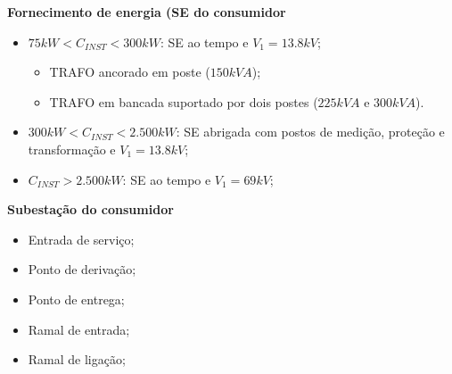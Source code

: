 \textbf{Fornecimento de energia (SE do consumidor}

\begin{itemize}
    \item $75kW < C_{INST} < 300kW$: SE ao tempo e $V_1=13.8kV$;
   	\begin{itemize}
    	\item TRAFO ancorado em poste ($150kVA$);
    	\item TRAFO em bancada suportado por dois postes ($225kVA$ e $300kVA$).
	\end{itemize}
    \item $300kW < C_{INST} < 2.500kW$: SE abrigada com postos de medição, proteção e transformação e $V_1=13.8kV$;
    \item $C_{INST} > 2.500kW$: SE ao tempo e $V_1=69kV$;
\end{itemize}

\textbf{Subestação do consumidor}
\begin{itemize}
    \item Entrada de serviço;
    \item Ponto de derivação;
    \item Ponto de entrega;
    \item Ramal de entrada;
    \item Ramal de ligação;
\end{itemize}